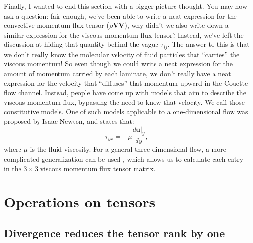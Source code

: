 \documentclass[10pt,twocolumn]{article}
\begin{document}
Finally, I wanted to end this section with a bigger-picture thought. You may now ask a question: fair enough, we've been able to write a neat expression for the convective momentum flux tensor ($\rho \pmb{V} \pmb{V}$), why didn't we also write down a similar expression for the viscous momentum flux tensor? Instead, we've left the discussion at hiding that quantity behind the vague $\tau_{ij}$. The answer to this is that we don't really know the molecular velocity of fluid particles that ``carries'' the viscous momentum! So even though we could write a neat expression for the amount of momentum carried by each laminate, we don't really have a neat expression for the velocity that ``diffuses'' that momentum upward in the Couette flow channel. Instead, people have come up with models that aim to describe the viscous momentum flux, bypassing the need to know that velocity. We call those constitutive models. One of such models applicable to a one-dimensional flow was proposed by Isaac Newton, and states that:
\begin{equation*}
\tau_{yx} = - \mu \frac{d \pmb{u}|_y}{dy} ,
\end{equation*}
where $\mu$ is the fluid viscosity.
For a general three-dimensional flow, a more complicated generalization can be used \cite{BSL}, which allows us to calculate each entry in the $3 \times 3$ viscous momentum flux tensor matrix.







\section*{Operations on tensors}

\subsection*{Divergence reduces the tensor rank by one}
\end{document}
